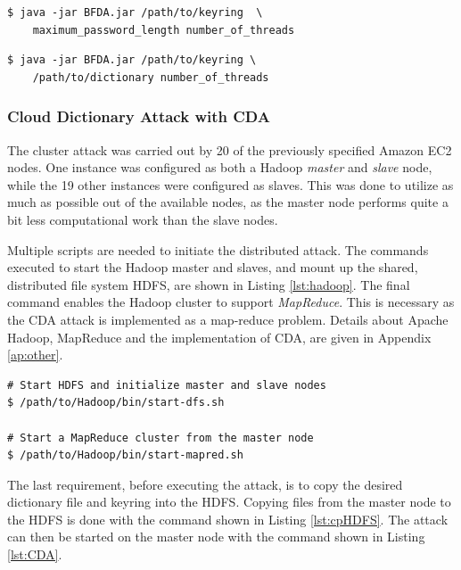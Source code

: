 \documentclass[pdftex,english,10pt,b5paper,twoside]{book}
\begin{document}
\lstset{label=lst:bf, caption=Running local brute force attack}
\begin{lstlisting}
$ java -jar BFDA.jar /path/to/keyring  \
    maximum_password_length number_of_threads
\end{lstlisting}

\lstset{label=lst:da, caption=Running local dictionary attack}
\begin{lstlisting}
$ java -jar BFDA.jar /path/to/keyring \
    /path/to/dictionary number_of_threads
\end{lstlisting}

\subsubsection{Cloud Dictionary Attack with \ac{CDA}}

The cluster attack was carried out by 20 of the previously specified Amazon EC2
nodes. One instance was configured as both a Hadoop \emph{master} and
\emph{slave} node, while the 19 other instances were configured as slaves.
This was done to utilize as much as possible out of the available nodes, as the
master node performs quite a bit less computational work than the slave nodes.

Multiple scripts are needed to initiate the distributed attack.
The commands executed to start the Hadoop master and slaves, and mount up the
shared, distributed file system \ac{HDFS}, are shown in Listing
\ref{lst:hadoop}. The final command enables the Hadoop cluster to support
\emph{MapReduce}. This is necessary as the \ac{CDA} attack is implemented as a
map-reduce problem. Details about Apache Hadoop, MapReduce and the
implementation of \ac{CDA}, are given in Appendix \ref{ap:other}.

\lstset{language=bash, label=lst:hadoop, caption=Starting Hadoop Cluster with HDFS}
\begin{lstlisting}
# Start HDFS and initialize master and slave nodes
$ /path/to/Hadoop/bin/start-dfs.sh

# Start a MapReduce cluster from the master node
$ /path/to/Hadoop/bin/start-mapred.sh
\end{lstlisting}

The last requirement, before executing the attack, is to copy the
desired dictionary file and keyring into the \ac{HDFS}. Copying files from the
master node to the \ac{HDFS} is done with the command shown in Listing
\ref{lst:cpHDFS}. The attack can then be started on the master node with the
command shown in Listing \ref{lst:CDA}.
\end{document}
